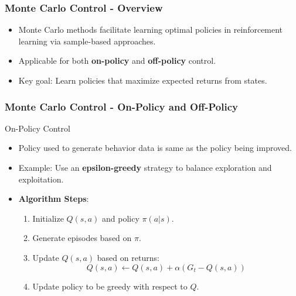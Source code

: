 \documentclass[aspectratio=169]{beamer}
\begin{document}
\begin{frame}[fragile]
    \frametitle{Monte Carlo Control - Overview}
    \begin{itemize}
        \item Monte Carlo methods facilitate learning optimal policies in reinforcement learning via sample-based approaches.
        \item Applicable for both \textbf{on-policy} and \textbf{off-policy} control.
        \item Key goal: Learn policies that maximize expected returns from states.
    \end{itemize}
\end{frame}

\begin{frame}[fragile]
    \frametitle{Monte Carlo Control - On-Policy and Off-Policy}
    \begin{block}{On-Policy Control}
        \begin{itemize}
            \item Policy used to generate behavior data is same as the policy being improved.
            \item Example: Use an \textbf{epsilon-greedy} strategy to balance exploration and exploitation.
            \item \textbf{Algorithm Steps}:
                \begin{enumerate}
                    \item Initialize \(Q(s, a)\) and policy \(\pi(a|s)\).
                    \item Generate episodes based on \(\pi\).
                    \item Update \(Q(s, a)\) based on returns:
                        \[
                        Q(s, a) \leftarrow Q(s, a) + \alpha (G_t - Q(s, a))
                        \]
                    \item Update policy to be greedy with respect to \(Q\).
                \end{enumerate}
        \end{itemize}
    \end{block}


\end{frame}
\end{document}
